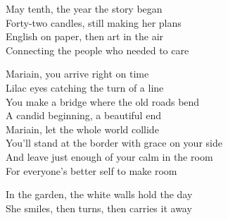 \begin{lyrics}
May tenth, the year the story began\\
Forty-two candles, still making her plans\\
English on paper, then art in the air\\
Connecting the people who needed to care

Mariain, you arrive right on time\\
Lilac eyes catching the turn of a line\\
You make a bridge where the old roads bend\\
A candid beginning, a beautiful end\\
Mariain, let the whole world collide\\
You’ll stand at the border with grace on your side\\
And leave just enough of your calm in the room\\
For everyone’s better self to make room

In the garden, the white walls hold the day\\
She smiles, then turns, then carries it away
\end{lyrics}

